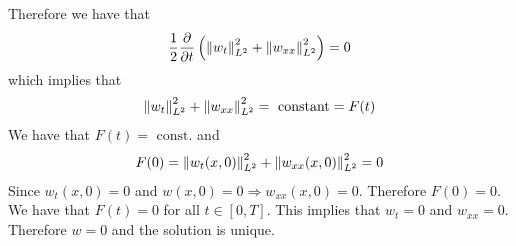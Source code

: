 Therefore we have that
\[
    \begin{split}
        \frac{1}{2} \frac{\partial}{\partial t} \left(\norm{w_t}_{L^2}^2 + \norm{w_{xx}}_{L^2}^2\right) = 0
    \end{split}
\]
which implies that
\[
    \begin{split}
        \norm{w_t}_{L^2}^2 + \norm{w_{xx}}_{L^2}^2 = \text{ constant} = F(t)
    \end{split}
\]
We have that \(F(t) = \text{ const.}\) and
\[
    \begin{split}
        F(0) = \norm{w_t(x, 0)}_{L^2}^2 + \norm{w_{xx}(x, 0)}_{L^2}^2 = 0
    \end{split}
\]
Since \(w_t(x, 0) = 0\) and \(w(x,0) = 0 \Rightarrow w_{xx}(x, 0) = 0\).
Therefore \(F(0) = 0\). We have that \(F(t) = 0\) for all \(t \in [0, T]\).
This implies that \(w_t = 0\) and \(w_{xx} = 0\). Therefore \(w = 0\) and the
solution is unique.

\newpage
